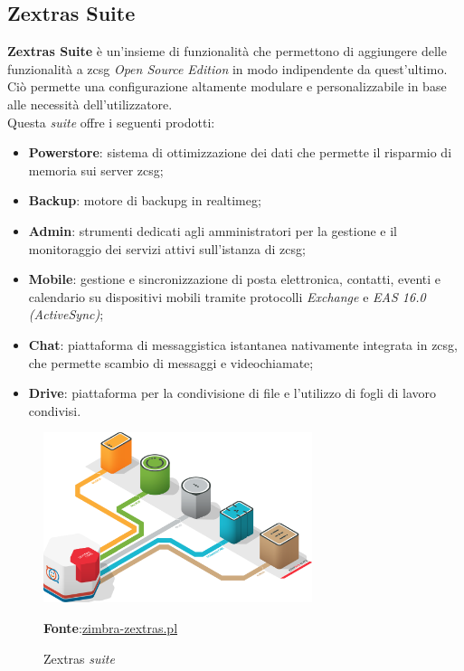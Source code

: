     \subsection{Zextras Suite}
        \textbf{Zextras Suite} è un'insieme di funzionalità che permettono di aggiungere delle funzionalità a \gls{zcsg} \textit{Open Source Edition} in modo indipendente da quest'ultimo. Ciò permette una configurazione altamente modulare e personalizzabile in base alle necessità dell'utilizzatore. \\
        Questa \textit{suite} offre i seguenti prodotti:
        \begin{itemize}
            \setlength\itemsep{0em}
            \item \textbf{Powerstore}: sistema di ottimizzazione dei dati che permette il risparmio di memoria sui server \gls{zcsg};
            \item \textbf{Backup}: motore di \gls{backupg} in \gls{realtimeg};
            \item \textbf{Admin}: strumenti dedicati agli amministratori per la gestione e il monitoraggio dei servizi attivi sull'istanza di \gls{zcsg};
            \item \textbf{Mobile}: gestione e sincronizzazione di posta elettronica, contatti, eventi e calendario su dispositivi mobili tramite protocolli \textit{Exchange} e \textit{EAS 16.0 (ActiveSync)};
            \item \textbf{Chat}: piattaforma di messaggistica istantanea nativamente integrata in \gls{zcsg}, che permette scambio di messaggi e videochiamate;
            \item \textbf{Drive}: piattaforma per la condivisione di file e l'utilizzo di fogli di lavoro condivisi.
        \end{itemize}
        
        \begin{figure}[h]
            \centering
            \includegraphics[width=0.7\textwidth]{immagini/zextras_suite.png}
            \caption{Zextras \textit{suite}}
            \textbf{Fonte}:\href{https://www.zimbra-zextras.pl/}{zimbra-zextras.pl}
            \label{fig: Zextras suite}
        \end{figure}
        
